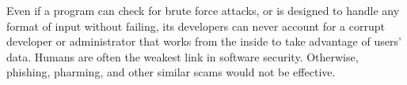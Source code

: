Even if a program can check for brute force attacks, or is designed to handle
any format of input without failing, its developers can never account for
a corrupt developer or administrator that works from the inside to take
advantage of users' data. Humans are often the weakest link in software
security. Otherwise, phishing, pharming, and other similar scams would not be
effective.
